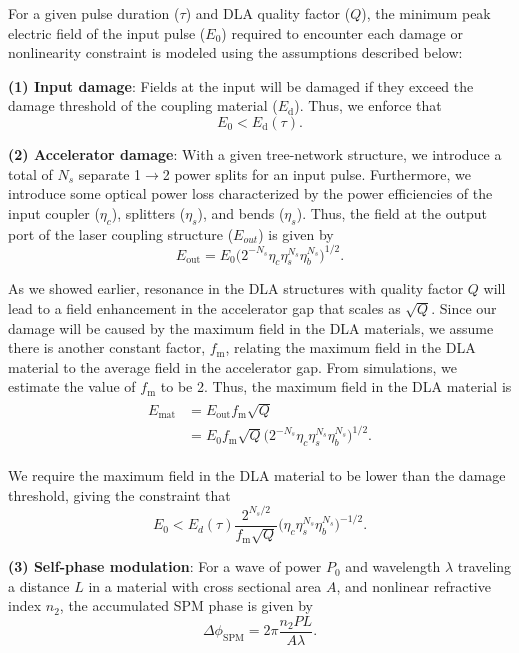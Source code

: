 For a given pulse duration ($\tau$) and DLA quality factor ($Q$), the minimum peak electric field of the input pulse ($E_0$) required to encounter each damage or nonlinearity constraint is modeled using the assumptions described below:

\textbf{(1) Input damage}: Fields at the input will be damaged if they exceed the damage threshold of the coupling material ($E_\textrm{d}$). Thus, we enforce that
\begin{equation}
E_0 < E_\textrm{d}(\tau).
\end{equation}

\textbf{(2) Accelerator damage}: With a given tree-network structure, we introduce a total of $N_s$ separate 1$\to$2 power splits for an input pulse. Furthermore, we introduce some optical power loss characterized by the power efficiencies of the input coupler ($\eta_{c}$), splitters ($\eta_s$), and bends ($\eta_s$). Thus, the field at the output port of the laser coupling structure ($E_{out}$) is given by
\begin{equation}
E_{\textrm{out}} = E_0 \Big( 2^{-N_s} \eta_c \eta_s^{N_s} \eta_b^{N_s} \Big)^{1/2}.
\end{equation}

As we showed earlier, resonance in the DLA structures with quality factor $Q$ will lead to a field enhancement in the accelerator gap that scales as $\sqrt{Q}$. Since our damage will be caused by the maximum field in the DLA materials, we assume there is another constant factor, $f_\textrm{m}$, relating the maximum field in the DLA material to the average field in the accelerator gap. From simulations, we estimate the value of $f_\textrm{m}$ to be 2. Thus, the maximum field in the DLA material is
\begin{align}
\begin{split}
E_{\textrm{mat}} &= E_\textrm{out} f_\textrm{m} \sqrt{Q} \\
 &= E_0 f_\textrm{m} \sqrt{Q} \Big( 2^{-N_s} \eta_c \eta_s^{N_s} \eta_b^{N_s} \Big)^{1/2}.
 \end{split}
\end{align}

We require the maximum field in the DLA material to be lower than the damage threshold, giving the constraint that
\begin{equation}
E_0 < E_d(\tau) \frac{2^{N_s/2}}{f_\textrm{m} \sqrt{Q}} \Big( \eta_c \eta_s^{N_s} \eta_b^{N_s} \Big)^{-1/2}.
\end{equation}

\textbf{(3) Self-phase modulation}: For a wave of power $P_0$ and wavelength $\lambda$ traveling a distance $L$ in a material with cross sectional area $A$, and nonlinear refractive index $n_2$, the accumulated SPM phase is given by \cite{teich1991fundamentals}
\begin{equation}
\Delta\phi_\textrm{SPM} = 2\pi \frac{n_2 PL}{A\lambda}.
\end{equation}

